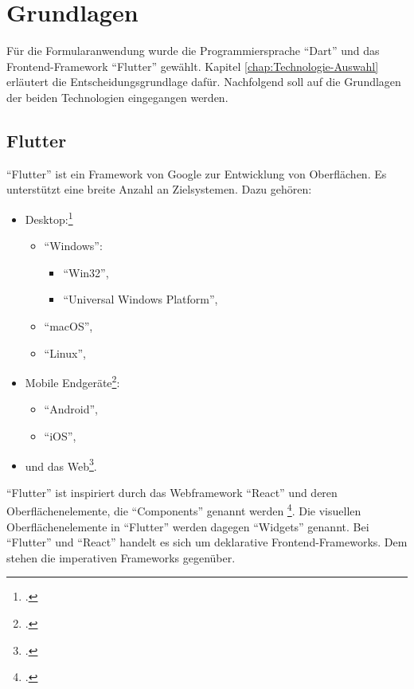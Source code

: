 \chapter{Grundlagen}
\label{chap:Grundlagen}

Für die Formularanwendung wurde die Programmiersprache \enquote{Dart} und das Frontend-Framework \enquote{Flutter} gewählt.
Kapitel \ref{chap:Technologie-Auswahl} erläutert die Entscheidungsgrundlage dafür.
Nachfolgend soll auf die Grundlagen der beiden Technologien eingegangen werden.

\section{Flutter}
\label{sec:Flutter-Grundlagen}

\enquote{Flutter} ist ein Framework von Google zur Entwicklung von Oberflächen.
Es unterstützt eine breite Anzahl an Zielsystemen.
 Dazu gehören:

\begin{itemize}[topsep=0pt,itemsep=-1ex,partopsep=1ex,parsep=1ex]
  \item Desktop:\footcite[Vgl.][]{DesktopSupportForFlutter}
        \begin{itemize}
          \item \enquote{Windows}:
                \begin{itemize}
                  \item \enquote{Win32},
                  \item \enquote{Universal Windows Platform},
                \end{itemize}
          \item \enquote{macOS},
          \item \enquote{Linux},
        \end{itemize}
  \item Mobile Endgeräte\footcite[Vgl.][]{FlutterBeautifulNativeAppsInRecordTime}:
        \begin{itemize}
          \item \enquote{Android},
          \item \enquote{iOS},
        \end{itemize}
  \item und das Web\footcite[Vgl.][]{WebSupportForFlutter}.
\end{itemize}

\enquote{Flutter} ist inspiriert durch das Webframework \enquote{React} und deren Oberflächenelemente, die \enquote{Components} genannt werden \footcite[Vgl.][]{IntroductionToWidgets}.
Die visuellen Oberflächenelemente in \enquote{Flutter} werden dagegen \enquote{Widgets} genannt.
Bei \enquote{Flutter} und \enquote{React} handelt es sich um deklarative Frontend-Frameworks.
Dem stehen die imperativen Frameworks gegenüber.


